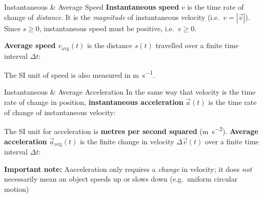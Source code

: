 \documentclass[12pt,compress,aspectratio=169,dvipsnames]{beamer}
\begin{document}
\begin{frame}{Instantaneous \& Average Speed}
  \textbf{Instantaneous speed} $v$ is the time rate of change of
  \emph{distance}. It is the \emph{magnitude} of instantaneous velocity
  (i.e.\ $v=|\vec v|$). Since $s\geq 0$, instantaneous speed must be positive,
  i.e.\ $v\geq 0$.


  \textbf{Average speed} $v_\text{avg}(t)$ is the distance $s(t)$ travelled over
  a finite time interval $\Delta t$:
  

  The SI unit of speed is also measured in \si{\metre\per\second}.
\end{frame}





\begin{frame}{Instantaneous \& Average Acceleration}
  In the same way that velocity is the time rate of change in position,
  \textbf{instantaneous acceleration} $\vec a(t)$ is the time rate of change of
  instantaneous velocity:


  The SI unit for acceleration is \textbf{metres per second squared}
  (\si{\metre\per\second\squared}). \textbf{Average acceleration}
  $\vec a_\text{avg}(t)$ is the finite change in velocity $\Delta\vec v(t)$ over
  a finite time interval $\Delta t$:


  \textbf{Important note:} Aacceleration only requires a \emph{change} in
  velocity; it does \emph{not} necessarily mean an object speeds up or slows
  down (e.g.\ uniform circular motion)
\end{frame}
\end{document}
